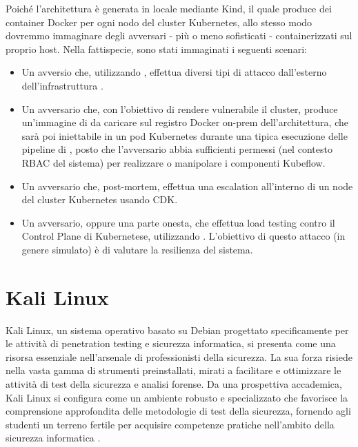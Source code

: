 Poiché l'architettura è generata in locale mediante Kind, il quale produce dei container Docker per ogni nodo del cluster Kubernetes, allo stesso modo dovremmo immaginare degli avversari - più o meno sofisticati - containerizzati sul proprio host. Nella fattispecie, sono stati immaginati i seguenti scenari:

\begin{itemize}
    \item Un avversio  che, utilizzando , effettua diversi tipi di attacco dall'esterno dell'infrastruttura .
    \item Un avversario che, con l'obiettivo di rendere vulnerabile il cluster, produce un'immagine  di  da caricare sul registro Docker on-prem dell'architettura, che sarà poi iniettabile in un pod Kubernetes durante una tipica esecuzione delle pipeline di , posto che l'avversario abbia sufficienti permessi (nel contesto RBAC del sistema) per realizzare o manipolare i componenti Kubeflow.
    \item Un avversario che, post-mortem, effettua una escalation all'interno di un node del cluster Kubernetes usando CDK.
    \item Un avversario, oppure una parte onesta, che effettua load testing contro il Control Plane di Kubernetese, utilizzando . L'obiettivo di questo attacco (in genere simulato) è di valutare la resilienza del sistema.
\end{itemize}

\section{Kali Linux}

Kali Linux, un sistema operativo basato su Debian progettato specificamente per le attività di penetration testing e sicurezza informatica, si presenta come una risorsa essenziale nell'arsenale di professionisti della sicurezza. La sua forza risiede nella vasta gamma di strumenti preinstallati, mirati a facilitare e ottimizzare le attività di test della sicurezza e analisi forense. Da una prospettiva accademica, Kali Linux si configura come un ambiente robusto e specializzato che favorisce la comprensione approfondita delle metodologie di test della sicurezza, fornendo agli studenti un terreno fertile per acquisire competenze pratiche nell'ambito della sicurezza informatica \cite{kali_linux_overview}.

